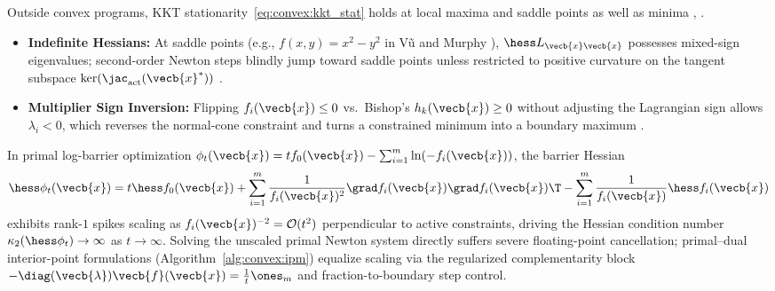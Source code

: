 \documentclass[../../../../master.tex]{subfiles}
\begin{document}
\begin{pitfall}
Outside convex programs, KKT stationarity~\eqref{eq:convex:kkt_stat} holds at local maxima and saddle points as well as minima , .
\begin{itemize}[leftmargin=1.4em, itemsep=2pt, topsep=2pt]
  \item \textbf{Indefinite Hessians:} At saddle points (e.g., $f(x, y) = x^2 - y^2$ in V\~{u}  and Murphy ), $\hess L_{\vecb{x}\vecb{x}}$ possesses mixed-sign eigenvalues; second-order Newton steps blindly jump toward saddle points unless restricted to positive curvature on the tangent subspace $\ker(\jac_{\mathrm{act}}(\vecb{x}^*))$ .
  \item \textbf{Multiplier Sign Inversion:} Flipping $f_i(\vecb{x}) \le 0$ vs.\ Bishop's $h_k(\vecb{x}) \ge 0$ without adjusting the Lagrangian sign allows $\lambda_i < 0$, which reverses the normal-cone constraint and turns a constrained minimum into a boundary maximum .
\end{itemize}
\end{pitfall}

\begin{pitfall}
In primal log-barrier optimization $\phi_t(\vecb{x}) = t f_0(\vecb{x}) - \sum_{i=1}^m \ln(-f_i(\vecb{x}))$, the barrier Hessian
\[
  \hess \phi_t(\vecb{x}) = t\hess f_0(\vecb{x}) + \sum_{i=1}^m \frac{1}{f_i(\vecb{x})^2}\grad f_i(\vecb{x})\grad f_i(\vecb{x})\T - \sum_{i=1}^m \frac{1}{f_i(\vecb{x})}\hess f_i(\vecb{x})
\]
exhibits rank-$1$ spikes scaling as $f_i(\vecb{x})^{-2} = \mathcal{O}(t^2)$ perpendicular to active constraints, driving the Hessian condition number $\kappa_2(\hess \phi_t) \to \infty$ as $t \to \infty$. Solving the unscaled primal Newton system directly suffers severe floating-point cancellation; primal--dual interior-point formulations (Algorithm~\ref{alg:convex:ipm}) equalize scaling via the regularized complementarity block $-\diag(\vecb{\lambda})\vecb{f}(\vecb{x}) = \frac{1}{t}\ones_m$ and fraction-to-boundary step control.
\end{pitfall}
\end{document}
